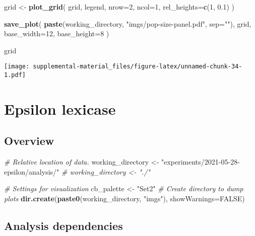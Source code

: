 \documentclass[]{book}
\newenvironment{Shaded}{\begin{snugshade}}{\end{snugshade}}
\newcommand{\CommentTok}[1]{\textcolor[rgb]{0.56,0.35,0.01}{\textit{#1}}}
\newcommand{\DataTypeTok}[1]{\textcolor[rgb]{0.13,0.29,0.53}{#1}}
\newcommand{\DecValTok}[1]{\textcolor[rgb]{0.00,0.00,0.81}{#1}}
\newcommand{\FloatTok}[1]{\textcolor[rgb]{0.00,0.00,0.81}{#1}}
\newcommand{\KeywordTok}[1]{\textcolor[rgb]{0.13,0.29,0.53}{\textbf{#1}}}
\newcommand{\NormalTok}[1]{#1}
\newcommand{\OtherTok}[1]{\textcolor[rgb]{0.56,0.35,0.01}{#1}}
\newcommand{\StringTok}[1]{\textcolor[rgb]{0.31,0.60,0.02}{#1}}
\begin{document}
\begin{Shaded}
\begin{Highlighting}[]
\NormalTok{grid <-}\StringTok{ }\KeywordTok{plot_grid}\NormalTok{(}
\NormalTok{  grid,}
\NormalTok{  legend,}
  \DataTypeTok{nrow=}\DecValTok{2}\NormalTok{,}
  \DataTypeTok{ncol=}\DecValTok{1}\NormalTok{,}
  \DataTypeTok{rel_heights=}\KeywordTok{c}\NormalTok{(}\DecValTok{1}\NormalTok{, }\FloatTok{0.1}\NormalTok{)}
\NormalTok{)}


\KeywordTok{save_plot}\NormalTok{(}
  \KeywordTok{paste}\NormalTok{(working_directory, }\StringTok{"imgs/pop-size-panel.pdf"}\NormalTok{, }\DataTypeTok{sep=}\StringTok{""}\NormalTok{),}
\NormalTok{  grid,}
  \DataTypeTok{base_width=}\DecValTok{12}\NormalTok{,}
  \DataTypeTok{base_height=}\DecValTok{8}
\NormalTok{)}

\NormalTok{grid}
\end{Highlighting}
\end{Shaded}

\texttt{[image: supplemental-material\_files/figure-latex/unnamed-chunk-34-1.pdf]}

\hypertarget{epsilon-lexicase}{%
\chapter{Epsilon lexicase}\label{epsilon-lexicase}}

\hypertarget{overview-3}{%
\section{Overview}\label{overview-3}}

\begin{Shaded}
\begin{Highlighting}[]
\CommentTok{# Relative location of data.}
\NormalTok{working_directory <-}\StringTok{ "experiments/2021-05-28-epsilon/analysis/"}
\CommentTok{# working_directory <- "./"}

\CommentTok{# Settings for visualization}
\NormalTok{cb_palette <-}\StringTok{ "Set2"}
\CommentTok{# Create directory to dump plots}
\KeywordTok{dir.create}\NormalTok{(}\KeywordTok{paste0}\NormalTok{(working_directory, }\StringTok{"imgs"}\NormalTok{), }\DataTypeTok{showWarnings=}\OtherTok{FALSE}\NormalTok{)}
\end{Highlighting}
\end{Shaded}

\hypertarget{analysis-dependencies-3}{%
\section{Analysis dependencies}\label{analysis-dependencies-3}}
\end{document}
